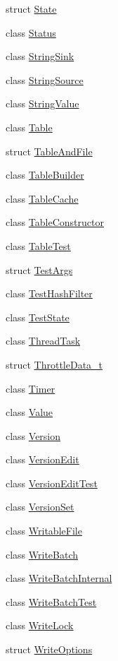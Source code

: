 \begin{DoxyCompactItemize}
struct \hyperlink{structleveldb_1_1_state}{State}
\item 
class \hyperlink{classleveldb_1_1_status}{Status}
\item 
class \hyperlink{classleveldb_1_1_string_sink}{String\+Sink}
\item 
class \hyperlink{classleveldb_1_1_string_source}{String\+Source}
\item 
class \hyperlink{classleveldb_1_1_string_value}{String\+Value}
\item 
class \hyperlink{classleveldb_1_1_table}{Table}
\item 
struct \hyperlink{structleveldb_1_1_table_and_file}{Table\+And\+File}
\item 
class \hyperlink{classleveldb_1_1_table_builder}{Table\+Builder}
\item 
class \hyperlink{classleveldb_1_1_table_cache}{Table\+Cache}
\item 
class \hyperlink{classleveldb_1_1_table_constructor}{Table\+Constructor}
\item 
class \hyperlink{classleveldb_1_1_table_test}{Table\+Test}
\item 
struct \hyperlink{structleveldb_1_1_test_args}{Test\+Args}
\item 
class \hyperlink{classleveldb_1_1_test_hash_filter}{Test\+Hash\+Filter}
\item 
class \hyperlink{classleveldb_1_1_test_state}{Test\+State}
\item 
class \hyperlink{classleveldb_1_1_thread_task}{Thread\+Task}
\item 
struct \hyperlink{structleveldb_1_1_throttle_data__t}{Throttle\+Data\+\_\+t}
\item 
class \hyperlink{classleveldb_1_1_timer}{Timer}
\item 
class \hyperlink{classleveldb_1_1_value}{Value}
\item 
class \hyperlink{classleveldb_1_1_version}{Version}
\item 
class \hyperlink{classleveldb_1_1_version_edit}{Version\+Edit}
\item 
class \hyperlink{classleveldb_1_1_version_edit_test}{Version\+Edit\+Test}
\item 
class \hyperlink{classleveldb_1_1_version_set}{Version\+Set}
\item 
class \hyperlink{classleveldb_1_1_writable_file}{Writable\+File}
\item 
class \hyperlink{classleveldb_1_1_write_batch}{Write\+Batch}
\item 
class \hyperlink{classleveldb_1_1_write_batch_internal}{Write\+Batch\+Internal}
\item 
class \hyperlink{classleveldb_1_1_write_batch_test}{Write\+Batch\+Test}
\item 
class \hyperlink{classleveldb_1_1_write_lock}{Write\+Lock}
\item 
struct \hyperlink{structleveldb_1_1_write_options}{Write\+Options}
\end{DoxyCompactItemize}
